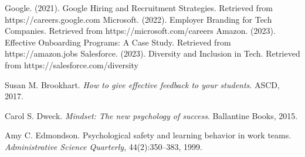 \begin{thebibliography}{9}
     Google. (2021). Google Hiring and Recruitment Strategies. Retrieved from https://careers.google.com
     Microsoft. (2022). Employer Branding for Tech Companies. Retrieved from https://microsoft.com/careers
     Amazon. (2023). Effective Onboarding Programs: A Case Study. Retrieved from https://amazon.jobs
     Salesforce. (2023). Diversity and Inclusion in Tech. Retrieved from https://salesforce.com/diversity

    Susan M. Brookhart.
    \emph{How to give effective feedback to your students}.
    ASCD, 2017.

    Carol S. Dweck.
    \emph{Mindset: The new psychology of success}.
    Ballantine Books, 2015.

    Amy C. Edmondson.
    Psychological safety and learning behavior in work teams.
    \emph{Administrative Science Quarterly}, 44(2):350--383, 1999.

\end{thebibliography}
